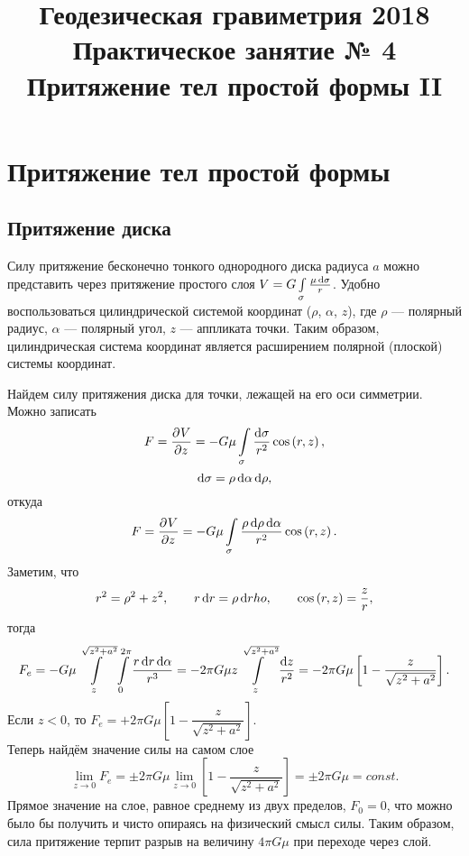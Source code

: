 \documentclass[11pt, a4paper]{article}
\title{{\Large Геодезическая гравиметрия 2018}\\ 
    {\bf\Large Практическое занятие № 4} \\
{\Large Притяжение тел простой формы II}}
\author{}
\date{\DTMusedate{lessondate}}
\theoremstyle{plain}
\theoremstyle{definition}
\theoremstyle{remark}
\begin{document}
\maketitle

\section{Притяжение тел простой формы}
\subsection{Притяжение диска}

Силу притяжение бесконечно тонкого однородного диска радиуса $a$ можно представить
через притяжение простого слоя $V = G\int\limits_{\sigma}\frac{\mu\dif\sigma}{r}$.
Удобно воспользоваться цилиндрической системой координат ($\rho$, $\alpha$, $z$), где $\rho$ ---
полярный радиус, $\alpha$ --- полярный угол, $z$ --- аппликата точки. Таким образом, цилиндрическая
система координат является расширением полярной (плоской) системы координат.

Найдем силу притяжения диска для точки, лежащей на его оси симметрии. Можно записать
\begin{equation*}
    F = \dpd{V}{z} = - G\mu\int\limits_{\sigma}\dfrac{\dif\sigma}{r^2}\cos\left( r, z \right),
\end{equation*}
\begin{equation*}
    \dif\sigma = \rho\dif\alpha\dif\rho,
\end{equation*}
откуда
\begin{equation*}
    F = \dpd{V}{z} = - G\mu\int\limits_{\sigma}\dfrac{\rho\dif\rho\dif\alpha}{r^2}\cos\left( r, z \right).
\end{equation*}
Заметим, что
\begin{equation*}
    r^2 = \rho^2 + z^2,\qquad r\dif r = \rho\dif rho,\qquad \cos\left( r, z \right) = \dfrac{z}{r},
\end{equation*}
тогда
\begin{equation*}
    F_e = - G\mu\int\limits_{z}^{\sqrt{z^2 + a^2}}\int\limits_{0}^{2\pi}\dfrac{r\dif
    r\dif\alpha}{r^3} = -2\pi G\mu z\int\limits_{z}^{\sqrt{z^2 + a^2}}\dfrac{\dif z}{r^2} =
    -2\pi G\mu\left[ 1 - \dfrac{z}{\sqrt{z^2 + a^2}}\right].
\end{equation*}
Если $z < 0$, то $F_e = +2\pi G\mu\left[ 1 - \dfrac{z}{\sqrt{z^2 + a^2}}\right]$. \\
Теперь найдём значение силы на самом слое
\begin{equation*}
    \lim\limits_{z\to 0} F_e = \pm2\pi G\mu\lim\limits_{z\to 0} \left[ 1 - \dfrac{z}{\sqrt{z^2 +
    a^2}}\right] = \pm2\pi G\mu = const.
\end{equation*}
Прямое значение на слое, равное среднему из двух пределов, $F_0 = 0$, что можно было бы получить и
чисто опираясь на физический смысл силы. Таким образом, сила притяжение
терпит разрыв на величину $4\pi G\mu$ при переходе через слой.
\end{document}
